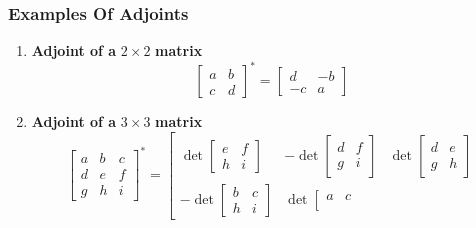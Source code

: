 \documentclass[titlepage,a4paper]{article}
\begin{document}
			\subsubsection{Examples Of Adjoints}
		\begin{enumerate}
			\item \textbf{Adjoint of a} $2\times2$ \textbf{matrix}
				\begin{equation}
					\left[
						\begin{matrix}
							a & b \\
							c & d
						\end{matrix}
					\right]^*
					=
					\left[
						\begin{matrix}
							d & -b \\
							-c & a
						\end{matrix}
					\right]
				\end{equation}
			\item \textbf{Adjoint of a} $3\times3$ \textbf{matrix}
				\begin{equation}
					\left[
						\begin{matrix}
							a & b & c \\
							d & e & f \\
							g & h & i
						\end{matrix}
					\right]^*
					=
					\left[
						\begin{matrix}
							\det
							\left[
								\begin{matrix}
									e & f \\
									h & i
								\end{matrix}
							\right]
							&
							-\det
							\left[
								\begin{matrix}
									d & f \\
									g & i
								\end{matrix}
							\right]
							&
							\det
							\left[
								\begin{matrix}
									d & e \\
									g & h
								\end{matrix}
							\right]
							\\
							-\det
							\left[
								\begin{matrix}
									b & c \\
									h & i
								\end{matrix}
							\right]
							&
							\det
							\left[
								\begin{matrix}
									a & c \\

\end{matrix}
\end{matrix}
\end{equation}
\end{enumerate}
\end{document}
